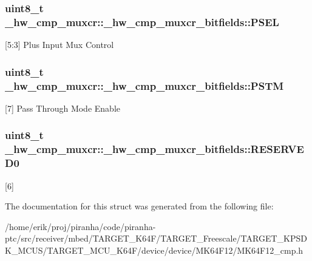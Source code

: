 \subsubsection[{\texorpdfstring{P\+S\+EL}{PSEL}}]{\setlength{\rightskip}{0pt plus 5cm}uint8\+\_\+t \+\_\+hw\+\_\+cmp\+\_\+muxcr\+::\+\_\+hw\+\_\+cmp\+\_\+muxcr\+\_\+bitfields\+::\+P\+S\+EL}\hypertarget{struct__hw__cmp__muxcr_1_1__hw__cmp__muxcr__bitfields_a5d15cf4186a08fc572b766e07a2f8fab}{}\label{struct__hw__cmp__muxcr_1_1__hw__cmp__muxcr__bitfields_a5d15cf4186a08fc572b766e07a2f8fab}
\mbox{[}5\+:3\mbox{]} Plus Input Mux Control 
\subsubsection[{\texorpdfstring{P\+S\+TM}{PSTM}}]{\setlength{\rightskip}{0pt plus 5cm}uint8\+\_\+t \+\_\+hw\+\_\+cmp\+\_\+muxcr\+::\+\_\+hw\+\_\+cmp\+\_\+muxcr\+\_\+bitfields\+::\+P\+S\+TM}\hypertarget{struct__hw__cmp__muxcr_1_1__hw__cmp__muxcr__bitfields_a26a2321b41b41543f34b328746ea11c1}{}\label{struct__hw__cmp__muxcr_1_1__hw__cmp__muxcr__bitfields_a26a2321b41b41543f34b328746ea11c1}
\mbox{[}7\mbox{]} Pass Through Mode Enable 
\subsubsection[{\texorpdfstring{R\+E\+S\+E\+R\+V\+E\+D0}{RESERVED0}}]{\setlength{\rightskip}{0pt plus 5cm}uint8\+\_\+t \+\_\+hw\+\_\+cmp\+\_\+muxcr\+::\+\_\+hw\+\_\+cmp\+\_\+muxcr\+\_\+bitfields\+::\+R\+E\+S\+E\+R\+V\+E\+D0}\hypertarget{struct__hw__cmp__muxcr_1_1__hw__cmp__muxcr__bitfields_a35929ee45d01a4a4afcc1fdfbd811720}{}\label{struct__hw__cmp__muxcr_1_1__hw__cmp__muxcr__bitfields_a35929ee45d01a4a4afcc1fdfbd811720}
\mbox{[}6\mbox{]} 

The documentation for this struct was generated from the following file\+:\begin{DoxyCompactItemize}
\item 
/home/erik/proj/piranha/code/piranha-\/ptc/src/receiver/mbed/\+T\+A\+R\+G\+E\+T\+\_\+\+K64\+F/\+T\+A\+R\+G\+E\+T\+\_\+\+Freescale/\+T\+A\+R\+G\+E\+T\+\_\+\+K\+P\+S\+D\+K\+\_\+\+M\+C\+U\+S/\+T\+A\+R\+G\+E\+T\+\_\+\+M\+C\+U\+\_\+\+K64\+F/device/device/\+M\+K64\+F12/M\+K64\+F12\+\_\+cmp.\+h\end{DoxyCompactItemize}
